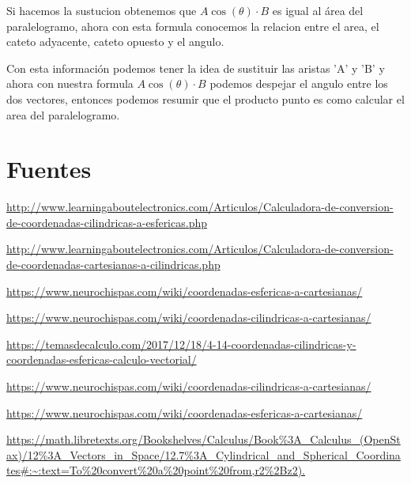 \documentclass{article}
\begin{document}
Si hacemos la sustucion obtenemos que \(A \cos(\theta) \cdot B\) es igual al área del paralelogramo, ahora con esta formula conocemos la relacion entre el area, el cateto adyacente, cateto opuesto y el angulo. 

Con esta información podemos tener la idea de sustituir las aristas 'A' y 'B' y ahora con nuestra formula \(A \cos(\theta) \cdot B\) podemos despejar el angulo entre los dos vectores, entonces podemos resumir que el producto punto es como calcular el area del paralelogramo.

\section{Fuentes}
\label{sec:orga35e0ca}

\url{http://www.learningaboutelectronics.com/Articulos/Calculadora-de-conversion-de-coordenadas-cilindricas-a-esfericas.php}

\url{http://www.learningaboutelectronics.com/Articulos/Calculadora-de-conversion-de-coordenadas-cartesianas-a-cilindricas.php}

\url{https://www.neurochispas.com/wiki/coordenadas-esfericas-a-cartesianas/}

\url{https://www.neurochispas.com/wiki/coordenadas-cilindricas-a-cartesianas/}

\url{https://temasdecalculo.com/2017/12/18/4-14-coordenadas-cilindricas-y-coordenadas-esfericas-calculo-vectorial/}

\url{https://www.neurochispas.com/wiki/coordenadas-cilindricas-a-cartesianas/}

\url{https://www.neurochispas.com/wiki/coordenadas-esfericas-a-cartesianas/}

\url{https://math.libretexts.org/Bookshelves/Calculus/Book\%3A\_Calculus\_(OpenStax)/12\%3A\_Vectors\_in\_Space/12.7\%3A\_Cylindrical\_and\_Spherical\_Coordinates\#:\~:text=To\%20convert\%20a\%20point\%20from,r2\%2Bz2).}
\end{document}
